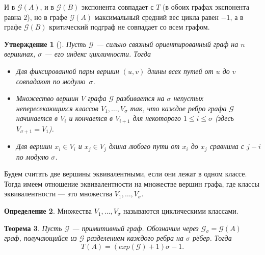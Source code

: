 \documentclass[12pt]{article}
\newtheorem{theorem}{Теорема}[section]
\newtheorem{proposition}[theorem]{Утверждение}
\theoremstyle{definition}
\newtheorem{definition}[theorem]{Определение}
\begin{document}
И в $\mathcal{G}(A)$, и в $\mathcal{G}(B)$ экспонента совпадает с $T$ (в обоих графах экспонента равна $2$), но в графе $\mathcal{G}(A)$ максимальный средний вес цикла равен $-1$, а в графе $\mathcal{G}(B)$ критический подграф не совпадает со всем графом.

\begin{proposition} [{\cite[лемма 3.4.1]{combinatorialMatrixTheory}}]
\label{cyclicityPaths}
Пусть $\mathcal{G}$ --- сильно связный ориентированный граф на $n$ вершинах, $\sigma$ --- его индекс цикличности. Тогда
\begin{itemize}
\item Для фиксированной пары вершин $(u, v)$ длины всех путей от $u$ до $v$ совпадают по модулю~$\sigma$.
\item Множество вершин $V$ графа $\mathcal{G}$ разбивается на $\sigma$ непустых непересекающихся классов $V_1, \dots, V_{\sigma}$ так, что каждое ребро графа $\mathcal{G}$ начинается в $V_i$ и кончается в $V_{i + 1}$ для некоторого $1 \le i \le \sigma$ (здесь $V_{\sigma + 1} = V_1$).
\item Для вершин $x_i \in V_i$ и $x_j \in V_j$ длина любого пути от $x_i$ до $x_j$ сравнима с $j - i$ по модулю $\sigma$.
\end{itemize}
\end{proposition}

Будем считать две вершины эквивалентными, если они лежат в одном классе. Тогда имеем отношение эквивалентности на множестве вершин графа, где классы эквивалентности --- это множества $V_1, \dots, V_{\sigma}$.

\begin{definition}
Множества $V_1, \dots, V_{\sigma}$ называются циклическими классами.
\end{definition}

\begin{theorem}
\label{homothetyGraph}
Пусть $\mathcal{G}$ --- примитивный граф. Обозначим через $\mathcal{G}_{\sigma} = \mathcal{G}(A)$ граф, получающийся из $\mathcal{G}$ разделением каждого ребра на $\sigma$ рёбер. Тогда
\begin{equation*}
T(A) = (exp(\mathcal{G}) + 1)\sigma - 1.
\end{equation*}
\end{theorem}
\end{document}
